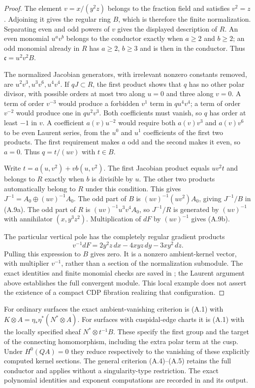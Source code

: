 \begin{proof}
The element $v=x/(y^2z)$ belongs to the fraction field and satisfies $v^2=z$. Adjoining it gives the regular ring $B$, which is therefore the finite normalization. Separating even and odd powers of $v$ gives the displayed description of $R$. An even monomial $u^av^b$ belongs to the conductor exactly when $a\ge2$ and $b\ge2$; an odd monomial already in $R$ has $a\ge2$, $b\ge3$ and is then in the conductor. Thus $\mathfrak c=u^2v^2B$.

The normalized Jacobian generators, with irrelevant nonzero constants removed, are $u^2v^3,u^3v^6,u^4v^4$. If $qJ\subset R$, the first product shows that $q$ has no other polar divisor, with possible orders at most two along $u=0$ and three along $v=0$. A term of order $v^{-3}$ would produce a forbidden $v^1$ term in $qu^4v^4$; a term of order $v^{-2}$ would produce one in $qu^2v^3$. Both coefficients must vanish, so $q$ has order at least $-1$ in $v$. A coefficient $a(v)u^{-2}$ would require both $a(v)v^3$ and $a(v)v^6$ to be even Laurent series, from the $u^0$ and $u^1$ coefficients of the first two products. The first requirement makes $a$ odd and the second makes it even, so $a=0$. Thus $q=t/(uv)$ with $t\in B$.

Write $t=a(u,v^2)+v b(u,v^2)$. The first Jacobian product equals $uv^2t$ and belongs to $R$ exactly when $b$ is divisible by $u$. The other two products automatically belong to $R$ under this condition. This gives $J^{-1}=A_0\oplus(uv)^{-1}A_0$. The odd part of $B$ is $(uv)^{-1}(uv^2)A_0$, giving $J^{-1}/B$ in (A.9a). The odd part of $R$ is $(uv)^{-1}u^3v^4A_0$, so $J^{-1}/R$ is generated by $(uv)^{-1}$ with annihilator $(x,y^3z^2)$. Multiplication of $dF$ by $(uv)^{-1}$ gives (A.9b).

The particular vertical pole has the completely regular gradient products
\[
 v^{-1}dF=2y^2z\,dx-4xyz\,dy-3xy^2\,dz.
\]
Pulling this expression to $B$ gives zero. It is a nonzero ambient-kernel vector, with multiplier $v^{-1}$, rather than a section of the normalization submodule. The exact identities and finite monomial checks are saved in ; the Laurent argument above establishes the full convergent module. This local example does not assert the existence of a compact CDP fibration realizing that configuration.
\end{proof}

For ordinary surfaces the exact ambient-vanishing criterion is (A.1) with $K\otimes A=\eta_*\eta^*(N^*\otimes A)$. For surfaces with cuspidal-edge charts it is (A.1) with the locally specified sheaf $N^*\otimes t^{-1}B$. These specify the first group and the target of the connecting homomorphism, including the extra polar term at the cusp. Under $H^0(QA)=0$ they reduce respectively to the vanishing of these explicitly computed kernel sections. The general criterion (A.4)--(A.5) retains the full conductor and applies without a singularity-type restriction. The exact polynomial identities and exponent computations are recorded in  and its output.

